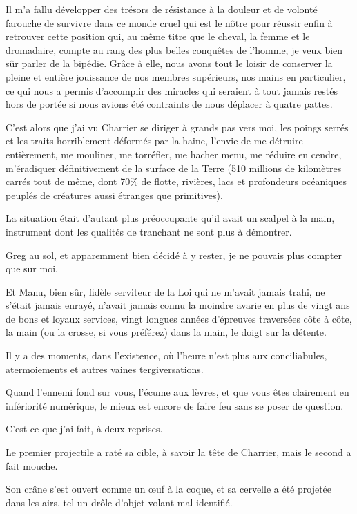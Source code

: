 Il m’a fallu développer des trésors de résistance à la douleur et de volonté farouche de survivre dans ce monde cruel qui est le nôtre pour réussir enfin à retrouver cette position qui, au même titre que le cheval, la femme et le dromadaire, compte au rang des plus belles conquêtes de l’homme, je veux bien sûr parler de la bipédie. Grâce à elle, nous avons tout le loisir de conserver la pleine et entière jouissance de nos membres supérieurs, nos mains en particulier, ce qui nous a permis d’accomplir des miracles qui seraient à tout jamais restés hors de portée si nous avions été contraints de nous déplacer à quatre pattes.

C’est alors que j’ai vu Charrier se diriger à grands pas vers moi, les poings serrés et les traits horriblement déformés par la haine, l’envie de me détruire entièrement, me mouliner, me torréfier, me hacher menu, me réduire en cendre, m’éradiquer définitivement de la surface de la Terre (510 millions de kilomètres carrés tout de même, dont 70\% de flotte, rivières, lacs et profondeurs océaniques peuplés de créatures aussi étranges que primitives).

La situation était d’autant plus préoccupante qu’il avait un scalpel à la main, instrument dont les qualités de tranchant ne sont plus à démontrer.

Greg au sol, et apparemment bien décidé à y rester, je ne pouvais plus compter que sur moi.

Et Manu, bien sûr, fidèle serviteur de la Loi qui ne m’avait jamais trahi, ne s’était jamais enrayé, n’avait jamais connu la moindre avarie en plus de vingt ans de bons et loyaux services, vingt longues années d’épreuves traversées côte à côte, la main (ou la crosse, si vous préférez) dans la main, le doigt sur la détente.

Il y a des moments, dans l’existence, où l’heure n’est plus aux conciliabules, atermoiements et autres vaines tergiversations.

Quand l’ennemi fond sur vous, l’écume aux lèvres, et que vous êtes clairement en infériorité numérique, le mieux est encore de faire feu sans se poser de question.

C’est ce que j’ai fait, à deux reprises.

Le premier projectile a raté sa cible, à savoir la tête de Charrier, mais le second a fait mouche.

Son crâne s’est ouvert comme un œuf à la coque, et sa cervelle a été projetée dans les airs, tel un drôle d’objet volant mal identifié.


